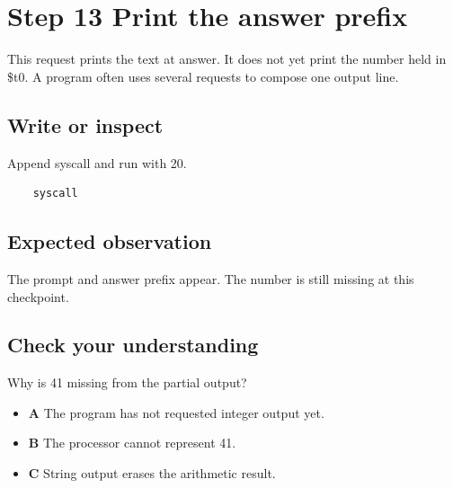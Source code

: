 \section{Step 13 Print the answer
  prefix}\label{001-console-calculation-s13-step-13-print-the-answer-prefix}

This request prints the text at answer. It does not yet print the number
held in \$t0. A program often uses several requests to compose one
output line.

\subsection{Write or
  inspect}\label{001-console-calculation-s13-write-or-inspect}

Append syscall and run with 20.

\begin{verbatim}
    syscall
\end{verbatim}

\subsection{Expected
  observation}\label{001-console-calculation-s13-expected-observation}

The prompt and answer prefix appear. The number is still missing at this
checkpoint.

\subsection{Check your
  understanding}\label{001-console-calculation-s13-check-your-understanding}

Why is 41 missing from the partial output?

\begin{itemize}
  \tightlist
  \item
        \textbf{A} The program has not requested integer output yet.
  \item
        \textbf{B} The processor cannot represent 41.
  \item
        \textbf{C} String output erases the arithmetic result.
\end{itemize}
